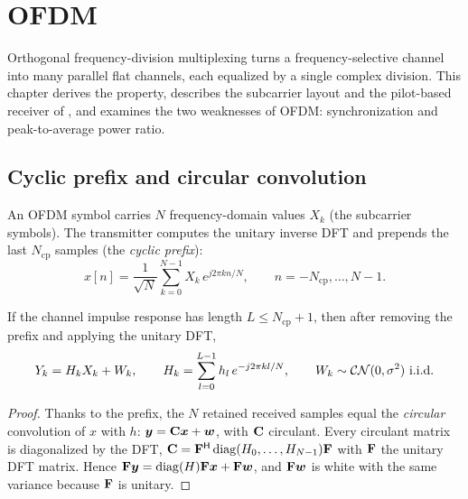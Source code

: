 \chapter{OFDM}\label{ch:ofdm}

Orthogonal frequency-division multiplexing turns a frequency-selective channel into many
parallel flat channels, each equalized by a single complex division. This chapter derives the
property, describes the subcarrier layout and the pilot-based receiver of
, and examines the two weaknesses of OFDM: synchronization and
peak-to-average power ratio.

\section{Cyclic prefix and circular convolution}
An OFDM symbol carries $N$ frequency-domain values $X_k$ (the subcarrier symbols). The
transmitter computes the unitary inverse DFT and prepends the last $N_{\mathrm{cp}}$ samples
(the \emph{cyclic prefix}):
\begin{equation}
  x[n]=\frac{1}{\sqrt N}\sum_{k=0}^{N-1}X_k\,e^{j2\pi kn/N},\qquad n=-N_{\mathrm{cp}},\dots,N-1 .
\end{equation}
\begin{proposition}
If the channel impulse response has length $L\le N_{\mathrm{cp}}+1$, then after removing the
prefix and applying the unitary DFT,
\begin{equation}
  Y_k=H_kX_k+W_k,\qquad H_k=\sum_{l=0}^{L-1}h_l\,e^{-j2\pi kl/N},\qquad W_k\sim\CN(0,\sigma^2)\ \text{i.i.d.}
  \label{eq:ofdm-model}
\end{equation}
\end{proposition}
\begin{proof}
Thanks to the prefix, the $N$ retained received samples equal the \emph{circular} convolution of
$x$ with $h$: $\bm{y}=\mathbf{C}\bm{x}+\bm{w}$, with $\mathbf{C}$ circulant. Every circulant matrix is
diagonalized by the DFT, $\mathbf{C}=\mathbf{F}^{\mathsf{H}}\operatorname{diag}(H_0,\dots,H_{N-1})\mathbf{F}$ with $\mathbf{F}$ the
unitary DFT matrix. Hence $\mathbf{F}\bm{y}=\operatorname{diag}(H)\mathbf{F}\bm{x}+\mathbf{F}\bm{w}$, and
$\mathbf{F}\bm{w}$ is white with the same variance because $\mathbf{F}$ is unitary.
\end{proof}

